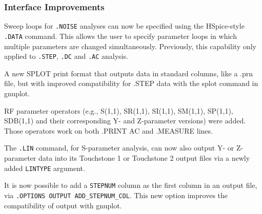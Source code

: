 \documentclass[letterpaper]{scrartcl}
\begin{document}
\subsubsection*{Interface Improvements}
\begin{XyceItemize}
\item Sweep loops for \texttt{.NOISE} analyses can now be specified using the
  HSpice-style \texttt{.DATA} command.  This allows the user to specify parameter
  loops in which multiple parameters are changed simultaneously.  Previously,
  this capability only applied to  \texttt{.STEP}, \texttt{.DC} and \texttt{.AC}
  analysis.
\item A new SPLOT print format that outputs data in standard columns,
  like a .prn file, but with improved compatibility for .STEP data with
  the splot command in gnuplot.
\item RF parameter operators (e.g., S(1,1), SR(1,1), SI(1,1), SM(1,1),
SP(1,1), SDB(1,1) and their corresponding Y- and Z-parameter versions)
were added. Those operators work on both .PRINT AC and .MEASURE lines.
\item  The \verb|.LIN| command, for S-parameter analysis, can now also
output Y- or Z-parameter data into its Touchstone 1 or Touchstone 2
output files via a newly added \texttt{LINTYPE} argument.
\item It is now possible to add a \texttt{STEPNUM} column as the first column
in an output file, via \texttt{.OPTIONS OUTPUT ADD\_STEPNUM\_COL}.
This new option improves the compatibility of \Xyce{} output with gnuplot.
\end{XyceItemize}
\end{document}
